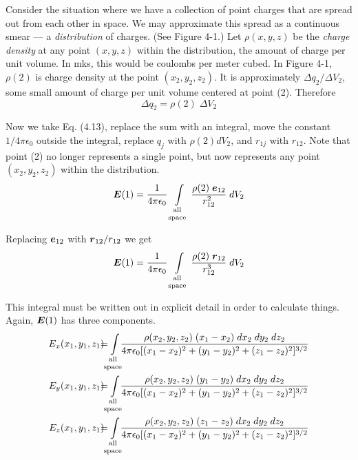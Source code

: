 Consider the situation where we have a collection of point charges 
that are spread out from each other in space.
We may approximate this spread as a continuous smear --- a \emph{distribution} of charges.
(See Figure 4-1.)
Let $\rho (x,y,z)$ be the \emph{charge density} at any point $(x,y,z)$ within the distribution,
the amount of charge per unit volume.
In mks, this would be coulombs per meter cubed.
In Figure 4-1, $\rho (2)$ is charge density at the point $(x_2,y_2,z_2)$.
It is approximately $\Delta q_2 / \Delta V_2$, some small amount of charge
per unit volume centered at point (2).  Therefore
\begin{equation}
  \Delta q_2 = \rho (2) \; \Delta V_2
\end{equation}

Now we take Eq. (4.13), replace the sum with an integral, 
move the constant $1 / 4 \pi \epsilon_0$ outside the integral,
replace $q_j$ with $\rho(2) dV_2$, and $r_{1j}$ with $r_{12}$.
Note that point (2) no longer represents a single point, but
now represents any point $(x_2,y_2,z_2)$ within the distribution.
\begin{equation}
  \bv{E}(1) = \frac{1}{4\pi\epsilon_0}
  \int\limits_{\genfrac{}{}{0pt}{1}{\mathrm{all}}{\mathrm{space}}}
  \frac{\rho(2) \; \bv{e}_{12}}{r^2_{12}} \; dV_2
\end{equation}

Replacing $\boldsymbol{e}_{12}$ with $\boldsymbol{r}_{12} / r_{12}$ we get
\begin{equation}
  \bv{E}(1) = \frac{1}{4\pi\epsilon_0}
  \int\limits_{\genfrac{}{}{0pt}{1}{\mathrm{all}}{\mathrm{space}}}
  \frac{\rho(2) \; \bv{r}_{12}}{r^3_{12}} \; dV_2
\end{equation}

This integral must be written out in explicit detail in order to calculate things.
Again, $\boldsymbol{E}(1)$ has three components.
\begin{eqnarray}
  E_x (x_1,y_1,z_1) \! \! \! \! &=& \! \! \! \! \! \! \! \!
  \int\limits_{\genfrac{}{}{0pt}{1}{\mathrm{all}}{\mathrm{space}}} \! \! \! \!
  \frac{\rho(x_2,y_2,z_2) \; (x_1 - x_2) \; dx_2 \; dy_2 \; dz_2}
       {4\pi\epsilon_0 [(x_1 - x_2)^2 + (y_1 - y_2)^2 + (z_1 - z_2)^2]^{3/2}}
       \\
  E_y (x_1,y_1,z_1) \! \! \! \! &=& \! \! \! \! \! \! \! \!
  \int\limits_{\genfrac{}{}{0pt}{1}{\mathrm{all}}{\mathrm{space}}} \! \! \! \!
  \frac{\rho(x_2,y_2,z_2) \; (y_1 - y_2) \; dx_2 \; dy_2 \; dz_2}
       {4\pi\epsilon_0 [(x_1 - x_2)^2 + (y_1 - y_2)^2 + (z_1 - z_2)^2]^{3/2}}
       \nonumber\\
  E_z (x_1,y_1,z_1) \! \! \! \! &=& \! \! \! \! \! \! \! \!
  \int\limits_{\genfrac{}{}{0pt}{1}{\mathrm{all}}{\mathrm{space}}} \! \! \! \!
  \frac{\rho(x_2,y_2,z_2) \; (z_1 - z_2) \; dx_2 \; dy_2 \; dz_2}
       {4\pi\epsilon_0 [(x_1 - x_2)^2 + (y_1 - y_2)^2 + (z_1 - z_2)^2]^{3/2}}
       \nonumber
\end{eqnarray}

